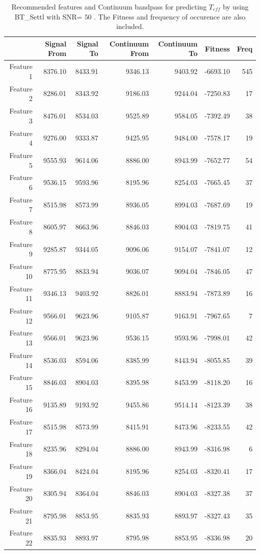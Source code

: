 {{\begin{table}
\begin{center}
\begin{tabular}{rrrrrrr}
  \hline
 & Signal From & Signal To & Continuum From & Continuum To & Fitness & Freq \\ 
  \hline
Feature 1 & 8376.10 & 8433.91 & 9346.13 & 9403.92 & -6693.10 & 545 \\ 
  Feature 2 & 8286.01 & 8343.92 & 9186.03 & 9244.04 & -7250.83 &  17 \\ 
  Feature 3 & 8476.01 & 8534.03 & 9525.89 & 9584.05 & -7392.49 &  38 \\ 
  Feature 4 & 9276.00 & 9333.87 & 9425.95 & 9484.00 & -7578.17 &  19 \\ 
  Feature 5 & 9555.93 & 9614.06 & 8886.00 & 8943.99 & -7652.77 &  54 \\ 
  Feature 6 & 9536.15 & 9593.96 & 8195.96 & 8254.03 & -7665.45 &  37 \\ 
  Feature 7 & 8515.98 & 8573.99 & 8936.05 & 8994.03 & -7687.69 &  19 \\ 
  Feature 8 & 8605.97 & 8663.96 & 8846.03 & 8904.03 & -7819.75 &  41 \\ 
  Feature 9 & 9285.87 & 9344.05 & 9096.06 & 9154.07 & -7841.07 &  12 \\ 
  Feature 10 & 8775.95 & 8833.94 & 9036.07 & 9094.04 & -7846.05 &  47 \\ 
  Feature 11 & 9346.13 & 9403.92 & 8826.01 & 8883.94 & -7873.89 &  16 \\ 
  Feature 12 & 9566.01 & 9623.96 & 9105.87 & 9163.91 & -7967.65 &   7 \\ 
  Feature 13 & 9566.01 & 9623.96 & 9536.15 & 9593.96 & -7998.01 &  42 \\ 
  Feature 14 & 8536.03 & 8594.06 & 8385.99 & 8443.94 & -8055.85 &  39 \\ 
  Feature 15 & 8846.03 & 8904.03 & 8395.98 & 8453.99 & -8118.20 &  16 \\ 
  Feature 16 & 9135.89 & 9193.92 & 9455.86 & 9514.14 & -8123.39 &  38 \\ 
  Feature 17 & 8515.98 & 8573.99 & 8415.91 & 8473.96 & -8233.55 &  42 \\ 
  Feature 18 & 8235.96 & 8294.04 & 8886.00 & 8943.99 & -8316.98 &   6 \\ 
  Feature 19 & 8366.04 & 8424.04 & 8195.96 & 8254.03 & -8320.41 &  17 \\ 
  Feature 20 & 8305.94 & 8364.04 & 8846.03 & 8904.03 & -8327.38 &  37 \\ 
  Feature 21 & 8795.98 & 8853.95 & 8835.93 & 8893.97 & -8327.43 &  35 \\ 
  Feature 22 & 8835.93 & 8893.97 & 8795.98 & 8853.95 & -8336.98 &  20 \\ 
   \hline
\end{tabular}
\caption {Recommended features and Continuum bandpass for predicting $ T_{eff} $ 
      by using BT\_Settl with SNR= $ 50 $ . 
      The Fitness and frequency of occurence are also included.} \label{tab:tab_SNR50_T} 
\end{center}
\end{table}


}}
